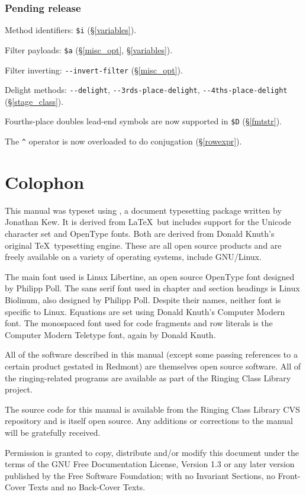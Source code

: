 \documentclass[a4paper,11pt,oneside]{book}
\newcommand{\sref}[1]{\hyperref[#1]{\S\ref{#1}}}
\begin{document}
\subsection{Pending release}
\begin{list}{}{\leftmargin=1em}
\item Method identifiers: \verb+$i+ (\sref{variables}).
\item Filter payloads: \verb+$a+ (\sref{misc_opt}, \sref{variables}). 
\item Filter inverting: \verb+--invert-filter+ (\sref{misc_opt}).
\item Delight methods: \verb+--delight+, \verb+--3rds-place-delight+, 
  \verb+--4ths-place-delight+ (\sref{stage_class}).
\item Fourths-place doubles lead-end symbols are now supported in \verb+$D+ 
  (\sref{fmtstr}).
\item The \verb+^+ operator is now overloaded to do conjugation 
  (\sref{rowexpr}).
\end{list}

\clearpage
\footnotesize
{}

\normalsize
\chapter*{Colophon}

This manual was typeset using \XeTeX{}, a document 
typesetting package written by Jonathan Kew.  It is derived from 
\LaTeX\ but includes support for the Unicode character set and OpenType fonts.
Both are derived from Donald Knuth's original \TeX\ typesetting engine.  
These are all open source products and are freely available on a variety of 
operating systems, include GNU/Linux. 

The main font used is Linux Libertine, an open source OpenType font designed
by Philipp Poll.  The sans serif font used in chapter and section headings
is Linux Biolinum, also designed by Philipp Poll.  Despite their names,
neither font is specific to Linux.  Equations are set using Donald Knuth's 
Computer Modern font.  The monospaced font used for code fragments and
row literals is the Computer Modern Teletype font, again by Donald Knuth.%

All of the software described in this manual (except some passing
references to a certain product gestated in Redmont) are themselves open
source software.  All of the ringing-related programs are available as 
part of the Ringing Class Library project.

The source code for this manual is available from the Ringing Class Library
CVS repository and is itself open source.  Any additions or corrections 
to the manual will be gratefully received.

\vfil
\footnotesize
Permission is granted to copy, distribute and/or modify this
document under the terms of the GNU Free Documentation License,
Version 1.3 or any later version published by the Free Software
Foundation; with no Invariant Sections, no Front-Cover Texts and
no Back-Cover Texts.
\end{document}
